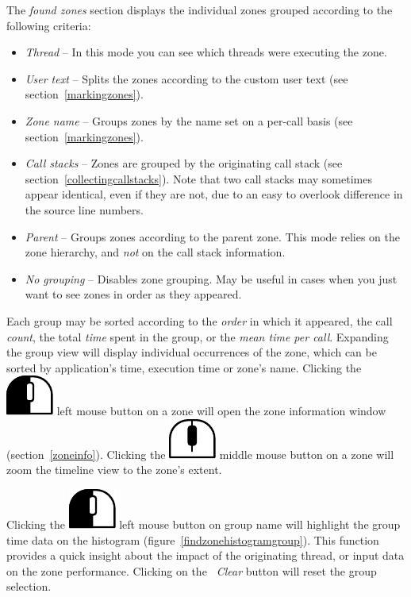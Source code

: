 \documentclass[hidelinks,titlepage,a4paper]{article}
\newcommand{\LMB}{\includegraphics[height=.8\baselineskip]{icons/lmb}}
\newcommand{\MMB}{\includegraphics[height=.8\baselineskip]{icons/mmb}}
\begin{document}
The \emph{found zones} section displays the individual zones grouped according to the following criteria:

\begin{itemize}
\item \emph{Thread} -- In this mode you can see which threads were executing the zone.
\item \emph{User text} -- Splits the zones according to the custom user text (see section~\ref{markingzones}).
\item \emph{Zone name} -- Groups zones by the name set on a per-call basis (see section~\ref{markingzones}).
\item \emph{Call stacks} -- Zones are grouped by the originating call stack (see section~\ref{collectingcallstacks}). Note that two call stacks may sometimes appear identical, even if they are not, due to an easy to overlook difference in the source line numbers.
\item \emph{Parent} -- Groups zones according to the parent zone. This mode relies on the zone hierarchy, and \emph{not} on the call stack information.
\item \emph{No grouping} -- Disables zone grouping. May be useful in cases when you just want to see zones in order as they appeared.
\end{itemize}

Each group may be sorted according to the \emph{order} in which it appeared, the call \emph{count}, the total \emph{time} spent in the group, or the \emph{mean time per call}. Expanding the group view will display individual occurrences of the zone, which can be sorted by application's time, execution time or zone's name. Clicking the \LMB{} left mouse button on a zone will open the zone information window (section~\ref{zoneinfo}). Clicking the \MMB{} middle mouse button on a zone will zoom the timeline view to the zone's extent.

Clicking the \LMB{} left mouse button on group name will highlight the group time data on the histogram (figure~\ref{findzonehistogramgroup}). This function provides a quick insight about the impact of the originating thread, or input data on the zone performance. Clicking on the \emph{\faBackspace~Clear} button will reset the group selection.
\end{document}
